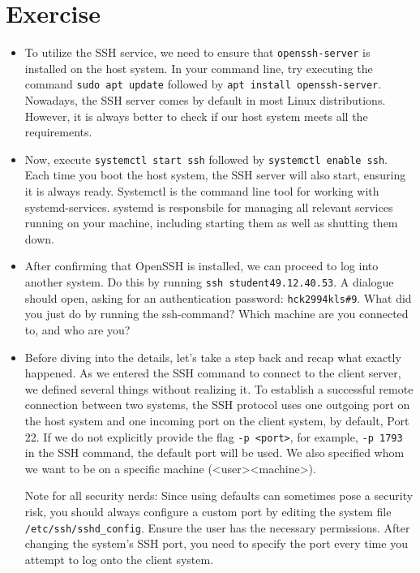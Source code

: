 \documentclass{dcbl/challenge}
\begin{document}
\section*{Exercise}
\begin{aufgabe}
\begin{itemize}
    \item To utilize the SSH service, we need to ensure that \texttt{openssh-server} is installed on the host system. In your command line, try executing the command \texttt{sudo apt update} followed by \texttt{apt install openssh-server}. Nowadays, the SSH server comes by default in most Linux distributions. However, it is always better to check if our host system meets all the requirements.

    \item Now, execute \texttt{systemctl start ssh} followed by \texttt{systemctl enable ssh}. Each time you boot the host system, the SSH server will also start, ensuring it is always ready. Systemctl is the command line tool for working with systemd-services. systemd is responsbile for managing all relevant services running on your machine, including starting them as well as shutting them down.

    \item After confirming that OpenSSH is installed, we can proceed to log into another system. Do this by running \texttt{ssh student\@49.12.40.53}. 
    A dialogue should open, asking for an authentication password: \texttt{hck2994kls\#9}. What did you just do by running the ssh-command? Which machine are you connected to, and who are you?
    
    \item Before diving into the details, let's take a step back and recap what exactly happened. As we entered the SSH command to connect to the client server, we defined several things without realizing it. To establish a successful remote connection between two systems, the SSH protocol uses one outgoing port on the host system and one incoming port on the client system, by default, Port 22. If we do not explicitly provide the flag \texttt{-p <port>}, for example, \texttt{-p 1793} in the SSH command, the default port will be used. We also specified whom we want to be on a specific machine (<user>\@<machine>).

    Note for all security nerds:
    Since using defaults can sometimes pose a security risk, you should always configure a custom port by editing the system file \texttt{/etc/ssh/sshd\_config}. Ensure the user has the necessary permissions. After changing the system's SSH port, you need to specify the port every time you attempt to log onto the client system.


\end{itemize}
\end{aufgabe}
\end{document}
